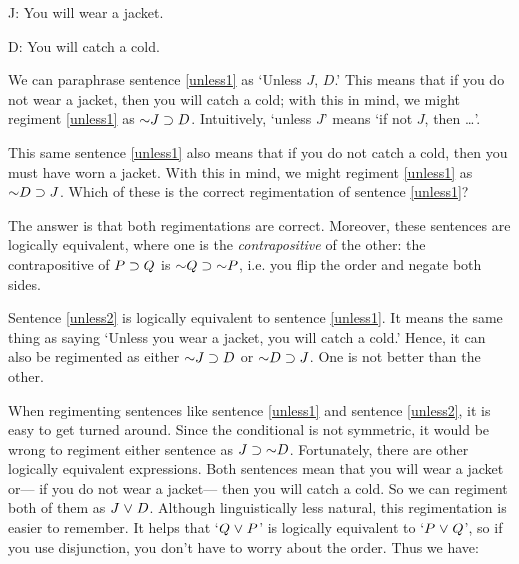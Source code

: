 \begin{ekey}
\item[J:] You will wear a jacket.
\item[D:] You will catch a cold.
\end{ekey}

We can paraphrase sentence \ref{unless1} as `Unless $J$, $D$.'
This means that if you do not wear a jacket, then you will catch a cold; with this in mind, we might regiment \ref{unless1} as $\enot J \eif D$.
Intuitively, `unless $J$' means `if not $J$, then \dots'. 

This same sentence \ref{unless1} also means that if you do not catch a cold, then you must have worn a jacket.
With this in mind, we might regiment \ref{unless1} as $\enot D \eif J$.
Which of these is the correct regimentation of sentence \ref{unless1}? 

The answer is that both regimentations are correct.
Moreover, these sentences are logically equivalent, where one is the \textit{contrapositive} of the other: the contrapositive of $P \supset Q$ is $\enot Q \eif \enot P$, i.e. you flip the order and negate both sides.

Sentence \ref{unless2} is logically equivalent to sentence \ref{unless1}. 
It means the same thing as saying `Unless you wear a jacket, you will catch a cold.' 
Hence, it can also be regimented as either $\enot J \eif D$ or $\enot D \eif J$.
One is not better than the other.

When regimenting sentences like sentence \ref{unless1} and sentence \ref{unless2}, it is easy to get turned around.
Since the conditional is not symmetric, it would be wrong to regiment either sentence as $J \eif \enot D$.
Fortunately, there are other logically equivalent expressions.
Both sentences mean that you will wear a jacket or--- if you do not wear a jacket--- then you will catch a cold.
So we can regiment both of them as $J \mkern1mu\vee\mkern1mu D$.
Although linguistically less natural, this regimentation is easier to remember.
It helps that  `$Q \mkern1mu\vee\mkern1mu P$' is logically equivalent to `$P \mkern1mu\vee\mkern1mu Q$', so if you use disjunction, you don't have to worry about the order.
Thus we have:



